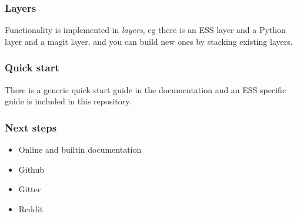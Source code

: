 \documentclass[presentation]{beamer}
\begin{document}
  \begin{frame}
    \frametitle{Layers}
    Functionality is implemented in \emph{layers}, eg there is an ESS layer and
    a Python layer and a magit layer, and you can build new ones by stacking
    existing layers.
  \end{frame}

  
  \begin{frame}
    \frametitle{Quick start}
    There is a generic quick start guide in the documentation and an ESS
    specific guide is included in this repository.
  \end{frame}

  \begin{frame}
    \frametitle{Next steps}
    \begin{itemize}
    \item Online and builtin documentation
    \item Github
    \item Gitter
    \item Reddit
    \end{itemize}
  \end{frame}
  
\end{document}

